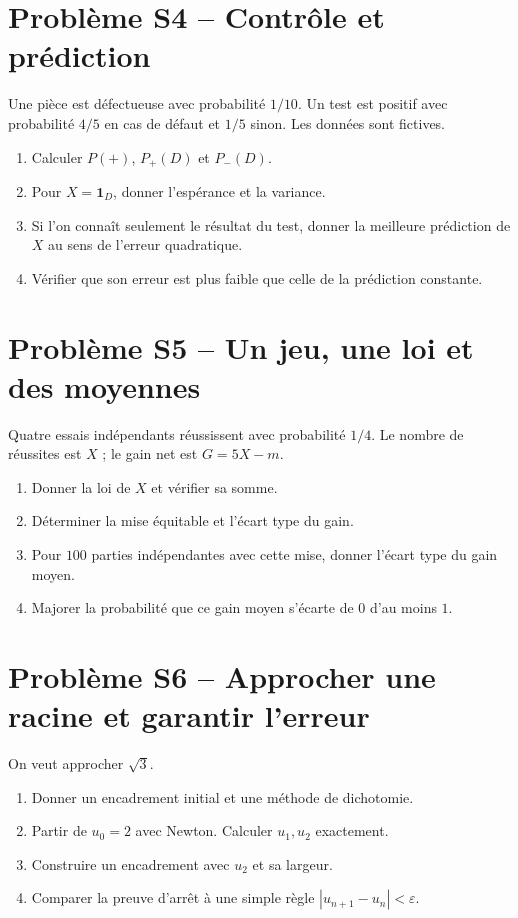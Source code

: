 \section*{Problème S4 -- Contrôle et prédiction}

Une pièce est défectueuse avec probabilité $1/10$. Un test est positif
avec probabilité $4/5$ en cas de défaut et $1/5$ sinon. Les données sont fictives.
\begin{enumerate}
\item Calculer $P(+)$, $P_+(D)$ et $P_-(D)$.
\item Pour $X=\mathbf1_D$, donner l'espérance et la variance.
\item Si l'on connaît seulement le résultat du test, donner la meilleure
prédiction de $X$ au sens de l'erreur quadratique.
\item Vérifier que son erreur est plus faible que celle de la prédiction constante.
\end{enumerate}

\section*{Problème S5 -- Un jeu, une loi et des moyennes}

Quatre essais indépendants réussissent avec probabilité $1/4$.
Le nombre de réussites est $X$ ; le gain net est $G=5X-m$.
\begin{enumerate}
\item Donner la loi de $X$ et vérifier sa somme.
\item Déterminer la mise équitable et l'écart type du gain.
\item Pour $100$ parties indépendantes avec cette mise, donner l'écart type du gain moyen.
\item Majorer la probabilité que ce gain moyen s'écarte de $0$ d'au moins $1$.
\end{enumerate}

\section*{Problème S6 -- Approcher une racine et garantir l'erreur}

On veut approcher $\sqrt3$.
\begin{enumerate}
\item Donner un encadrement initial et une méthode de dichotomie.
\item Partir de $u_0=2$ avec Newton. Calculer $u_1,u_2$ exactement.
\item Construire un encadrement avec $u_2$ et sa largeur.
\item Comparer la preuve d'arrêt à une simple règle $|u_{n+1}-u_n|<\varepsilon$.
\end{enumerate}

